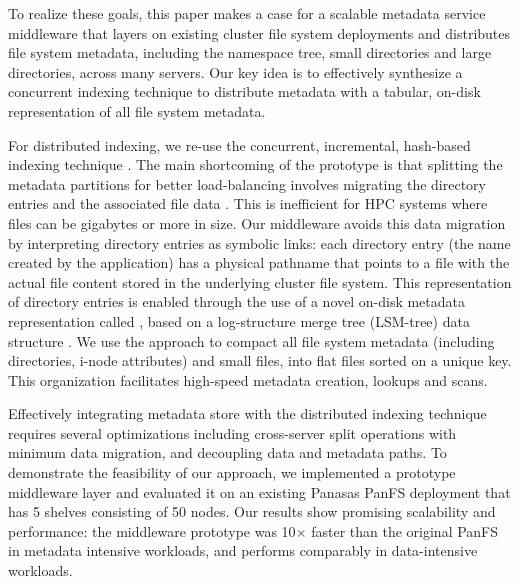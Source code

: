 To realize these goals, this paper makes a case for a scalable metadata service
middleware that layers on existing cluster file system deployments and
distributes file system metadata, including the namespace tree, small
directories and large directories, across many servers.
Our key idea is to effectively synthesize a concurrent indexing
technique to distribute metadata with a tabular, on-disk representation of all
file system metadata.

For distributed indexing, we re-use the concurrent, incremental, hash-based
\giga indexing technique \cite{GIGA11}.
The main shortcoming of the \giga prototype is that splitting
the metadata partitions for better load-balancing involves migrating the
directory entries and the associated file data \cite{GIGA11}.
This is inefficient for HPC systems where files can be gigabytes or more in
size. Our middleware avoids this data migration by interpreting directory
entries as symbolic links: each directory entry (the name created by the
application) has a physical pathname that points to a file
with the actual file content stored in the underlying cluster file system.
This representation of directory entries is enabled through the use
of a novel on-disk metadata representation called \tfs \cite{TableFS},
based on a log-structure merge tree (LSM-tree) data structure \cite{ONeil1996}.
We use the \tfs approach to compact all file system metadata
(including directories, i-node attributes) and small files,
into flat files sorted on a unique key.
This organization facilitates high-speed metadata creation, lookups and scans.

Effectively integrating \tfs metadata store with the distributed indexing
technique requires several optimizations including cross-server split operations
with minimum data migration, and decoupling data and metadata paths.
To demonstrate the feasibility of our approach,
we implemented a prototype middleware layer and evaluated it
on an existing Panasas PanFS deployment \cite{PanFS} that has 5 shelves consisting of 50 nodes.
Our results show promising scalability and performance:
the middleware prototype was 10$\times$ faster than the original PanFS
in metadata intensive workloads, and performs comparably in data-intensive workloads.
